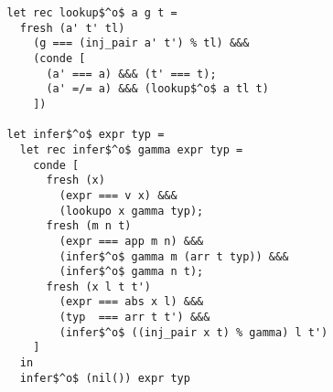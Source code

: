 \begin{lstlisting}
   let rec lookup$^o$ a g t =
     fresh (a' t' tl)
       (g === (inj_pair a' t') % tl) &&&
       (conde [
         (a' === a) &&& (t' === t);
         (a' =/= a) &&& (lookup$^o$ a tl t)
       ])

   let infer$^o$ expr typ =
     let rec infer$^o$ gamma expr typ =
       conde [
         fresh (x)
           (expr === v x) &&&
           (lookupo x gamma typ);
         fresh (m n t)
           (expr === app m n) &&&
           (infer$^o$ gamma m (arr t typ)) &&&
           (infer$^o$ gamma n t);
         fresh (x l t t')
           (expr === abs x l) &&&
           (typ  === arr t t') &&&
           (infer$^o$ ((inj_pair x t) % gamma) l t')
       ]
     in
     infer$^o$ (nil()) expr typ
\end{lstlisting}
